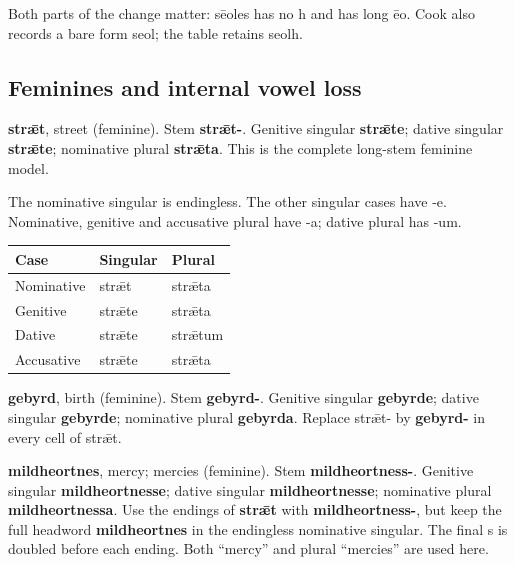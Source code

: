 Both parts of the change matter: sēoles has no h and has long ēo. Cook also records a bare form seol; the table retains seolh.

\subsection*{Feminines and internal vowel loss}

\textbf{strǣt}, street (feminine). Stem \textbf{strǣt-}. Genitive singular \textbf{strǣte}; dative singular \textbf{strǣte}; nominative plural \textbf{strǣta}. This is the complete long-stem feminine model.

The nominative singular is endingless. The other singular cases have -e. Nominative, genitive and accusative plural have -a; dative plural has -um.

\par\begingroup
\fontsize{10.5}{13.2}\selectfont
\setlength{\LTleft}{0pt}\setlength{\LTright}{\fill}
\noindent
\begin{tabular}{@{}>{\raggedright\arraybackslash}p{39.46mm}>{\raggedright\arraybackslash}p{39.46mm}>{\raggedright\arraybackslash}p{39.46mm}@{}}
\toprule
\textbf{Case} & \textbf{Singular} & \textbf{Plural} \\
\midrule
Nominative & strǣt & strǣta \\
Genitive & strǣte & strǣta \\
Dative & strǣte & strǣtum \\
Accusative & strǣte & strǣta \\
\bottomrule
\end{tabular}
\par\endgroup

\textbf{gebyrd}, birth (feminine). Stem \textbf{gebyrd-}. Genitive singular \textbf{gebyrde}; dative singular \textbf{gebyrde}; nominative plural \textbf{gebyrda}. Replace strǣt- by \textbf{gebyrd-} in every cell of strǣt.

\textbf{mildheortnes}, mercy; mercies (feminine). Stem \textbf{mildheortness-}. Genitive singular \textbf{mildheortnesse}; dative singular \textbf{mildheortnesse}; nominative plural \textbf{mildheortnessa}. Use the endings of \textbf{strǣt} with \textbf{mildheortness-}, but keep the full headword \textbf{mildheortnes} in the endingless nominative singular. The final s is doubled before each ending. Both “mercy” and plural “mercies” are used here.

